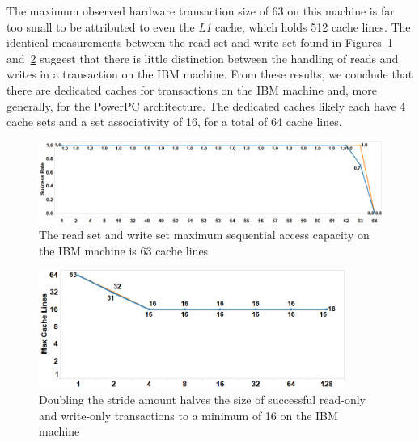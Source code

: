 \documentclass{article}
\begin{document}
The maximum observed hardware transaction size of 63 on this machine is far too
small to be attributed to even the \textit{L1} cache, which holds 512 cache
lines. The identical measurements between the read set and write set found in
Figures~\ref{fig:wttm_capacity_readwrite_ibm}
and~\ref{fig:wttm_stride_readwrite_ibm} suggest that there is little distinction
between the handling of reads and writes in a transaction on the IBM machine.
From these results, we conclude that there are dedicated caches for transactions
on the IBM machine and, more generally, for the PowerPC architecture. The
dedicated caches likely each have 4 cache sets and a set associativity of 16,
for a total of 64 cache lines.

\begin{figure}[]%
\centering
{}
\includegraphics[width=\linewidth]{images/wttm_capacity_readwrite_ibm}
\caption{The read set and write set maximum sequential access capacity on the
IBM machine is 63 cache lines}
\label{fig:wttm_capacity_readwrite_ibm}
\end{figure}

\begin{figure}[]%
\centering
{}
\includegraphics[width=100mm]{images/wttm_stride_readwrite_ibm}
\caption{Doubling the stride amount halves the size of successful read-only and
write-only transactions to a minimum of 16 on the IBM machine}
\label{fig:wttm_stride_readwrite_ibm}
\end{figure}
\end{document}
